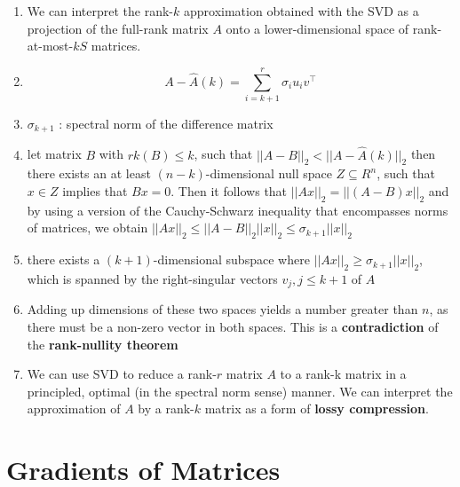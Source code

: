 \begin{enumerate}
    \item We can interpret the rank-$k$ approximation obtained with the SVD as a projection of the full-rank matrix $A$ onto a lower-dimensional space of rank-at-most-$kS$ matrices.

    \item \[
        \displaystyle
        A - \hat{A}(k) = 
        \sum_{i=k+1}^{r} \sigma_iu_iv^\top
    \]

    \item $\sigma_{k+1}$ : spectral norm of the difference matrix

    \item let matrix $B$ with $rk(B) \leq k$, such that $||A-B||_2 < ||A-\hat{A}(k)||_2$ then there exists an at least $(n - k)$-dimensional null space $Z \subseteq R^n$, such that $x \in Z$ implies that $Bx = 0$. Then it follows that $||Ax||_2=||(A-B)x||_2$ and by using a version of the Cauchy-Schwarz inequality  that encompasses norms of matrices, we obtain $||Ax||_2 \leq ||A-B||_2||x||_2 \leq \sigma_{k+1}||x||_2$

    \item there exists a $(k + 1)$-dimensional subspace where $||Ax||_2 \geq \sigma _{k+1}||x||_2$, which is spanned by the right-singular vectors $v_j, j \leq k + 1$ of $A$

    \item Adding up dimensions of these two spaces yields a number greater than $n$, as there must be a non-zero vector in both spaces. This is a \textbf{contradiction} of the \textbf{rank-nullity theorem}

    \item We can use SVD to reduce a rank-$r$ matrix $A$ to a rank-k matrix  in a principled, optimal (in the spectral norm sense) manner. We can interpret the approximation of $A$ by a rank-$k$ matrix as a form of \textbf{lossy compression}.

\end{enumerate}



\section{Gradients of Matrices}
